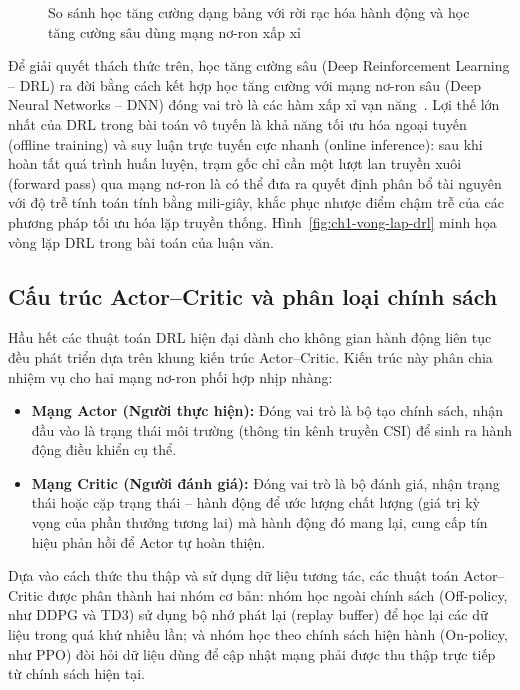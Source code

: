 \begin{figure}[htbp]
\centering
\resizebox{\textwidth}{!}{}
\caption{So sánh học tăng cường dạng bảng với rời rạc hóa hành động và học tăng cường sâu dùng mạng nơ-ron xấp xỉ}
\label{fig:ch1-bang-vs-drl}
\end{figure}

Để giải quyết thách thức trên, học tăng cường sâu (Deep Reinforcement Learning -- DRL) ra đời bằng cách
kết hợp học tăng cường với mạng nơ-ron sâu (Deep Neural Networks -- DNN) đóng vai trò là các hàm xấp xỉ
vạn năng~\cite{Mnih2015DQN}. Lợi thế lớn nhất của DRL trong bài toán vô tuyến là khả năng tối ưu hóa ngoại
tuyến (offline training) và suy luận trực tuyến cực nhanh (online inference): sau khi hoàn tất quá trình
huấn luyện, trạm gốc chỉ cần một lượt lan truyền xuôi (forward pass) qua mạng nơ-ron là có thể đưa ra quyết
định phân bổ tài nguyên với độ trễ tính toán tính bằng mili-giây, khắc phục nhược điểm chậm trễ của các
phương pháp tối ưu hóa lặp truyền thống. Hình~\ref{fig:ch1-vong-lap-drl} minh họa vòng lặp DRL trong bài
toán của luận văn.



\subsection{Cấu trúc Actor--Critic và phân loại chính sách}
\label{ssec:actor-critic}

Hầu hết các thuật toán DRL hiện đại dành cho không gian hành động liên tục đều phát triển dựa trên khung
kiến trúc Actor--Critic. Kiến trúc này phân chia nhiệm vụ cho hai mạng nơ-ron phối hợp nhịp nhàng:
\begin{itemize}
\item \textbf{Mạng Actor (Người thực hiện):} Đóng vai trò là bộ tạo chính sách, nhận đầu vào là trạng thái
  môi trường (thông tin kênh truyền CSI) để sinh ra hành động điều khiển cụ thể.
\item \textbf{Mạng Critic (Người đánh giá):} Đóng vai trò là bộ đánh giá, nhận trạng thái hoặc cặp trạng
  thái -- hành động để ước lượng chất lượng (giá trị kỳ vọng của phần thưởng tương lai) mà hành động đó
  mang lại, cung cấp tín hiệu phản hồi để Actor tự hoàn thiện.
\end{itemize}
Dựa vào cách thức thu thập và sử dụng dữ liệu tương tác, các thuật toán Actor--Critic được phân thành hai
nhóm cơ bản: nhóm học ngoài chính sách (Off-policy, như DDPG và TD3) sử dụng bộ nhớ phát lại (replay
buffer) để học lại các dữ liệu trong quá khứ nhiều lần; và nhóm học theo chính sách hiện hành (On-policy,
như PPO) đòi hỏi dữ liệu dùng để cập nhật mạng phải được thu thập trực tiếp từ chính sách hiện tại.


